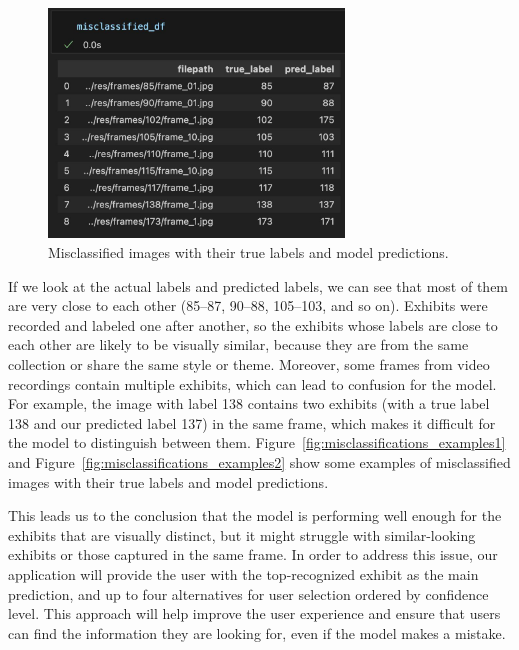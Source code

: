 \begin{figure}[h]
    \centering
    \includegraphics[width=0.7\textwidth]{img/misclassifications.png}
    \caption{Misclassified images with their true labels and model predictions.}\label{fig:misclassifications}
\end{figure}

If we look at the actual labels and predicted labels, we can see that most of them are very close to each other (85--87, 90--88, 105--103, and so on). Exhibits were recorded and labeled one after another, so the exhibits whose labels are close to each other are likely to be visually similar, because they are from the same collection or share the same style or theme. Moreover, some frames from video recordings contain multiple exhibits, which can lead to confusion for the model. For example, the image with label 138 contains two exhibits (with a true label 138 and our predicted label 137) in the same frame, which makes it difficult for the model to distinguish between them. Figure~\ref{fig:misclassifications_examples1} and Figure~\ref{fig:misclassifications_examples2} show some examples of misclassified images with their true labels and model predictions.

This leads us to the conclusion that the model is performing well enough for the exhibits that are visually distinct, but it might struggle with similar-looking exhibits or those captured in the same frame. In order to address this issue, our application will provide the user with the top-recognized exhibit as the main prediction, and up to four alternatives for user selection ordered by confidence level. This approach will help improve the user experience and ensure that users can find the information they are looking for, even if the model makes a mistake.

